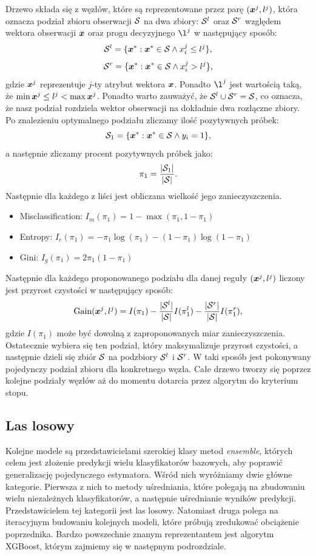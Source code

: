 \documentclass{book}
\begin{document}
	Drzewo składa się z węzłów, które są reprezentowane przez parę $(\boldsymbol{x}^j, l^j)$, która oznacza podział zbioru obserwacji $\mathcal{S}$ na dwa zbiory: $\mathcal{S}^{l}$ oraz $\mathcal{S}^{r}$ względem wektora obserwacji $\boldsymbol{x}$ oraz progu decyzyjnego $\l^j$ w następujący sposób:
	$$ \mathcal{S}^l = \{ \boldsymbol{x}^* : \boldsymbol{x}^* \in \mathcal{S} \land x^j_i \leq l^j \} \text{,} $$
	$$ \mathcal{S}^r = \{ \boldsymbol{x}^* : \boldsymbol{x}^* \in \mathcal{S} \land x^j_i > l^j \} \text{,} $$
	gdzie $\boldsymbol{x}^j$ reprezentuje $j$-ty atrybut wektora $\boldsymbol{x}$. Ponadto $\l^j$ jest wartością taką, że $\min{\boldsymbol{x}^j} \leq l^j < \max{\boldsymbol{x}^j}$. Ponadto warto zauważyć, że $\mathcal{S}^l \cup \mathcal{S}^r = \mathcal{S}$, co oznacza, że nasz podział rozdziela wektor obserwacji na dokładnie dwa rozłączne zbiory.
	Po znalezieniu optymalnego podziału zliczamy ilość pozytywnych próbek:
	$$ \mathcal{S}_1  = \{ \boldsymbol{x}^* : \boldsymbol{x}^* \in \mathcal{S} \land y_i = 1 \} \text{,} $$
	a następnie zliczamy procent pozytywnych próbek jako:
	$$ \pi_1 = \frac{|\mathcal{S}_1|}{|\mathcal{S}|} \text{.}$$
	Następnie dla każdego z liści jest obliczana wielkość jego zanieczyszczenia.
	\begin{itemize}
		\item Misclassification: $I_m(\pi_1) = 1 - \max(\pi_1, 1 - \pi_1)$
		\item Entropy: $I_e(\pi_1) = -\pi_1 \log(\pi_1) - (1 - \pi_1) \log (1 - \pi_1)$
		\item Gini: $I_g(\pi_1) = 2 \pi_1 (1 - \pi_1)$
	\end{itemize}{}
	Następnie dla każdego proponowanego podziału dla danej reguły $(\boldsymbol{x}^j, l^j)$ liczony jest przyrost czystości w następujący sposób:
	$$ \text{Gain}(\boldsymbol{x}^j, l^j) = I(\pi_1) - \frac{|\mathcal{S}^l|}{|\mathcal{S}|} I(\pi_1^l) - \frac{|\mathcal{S}^r|}{|\mathcal{S}|} I(\pi_1^r) \text{,}$$
	gdzie $I(\pi_1)$ może być dowolną z zaproponowanych miar zanieczyszczenia.
	Ostatecznie wybiera się ten podział, który maksymalizuje przyrost czystości, a następnie dzieli się zbiór $\mathcal{S}$ na podzbiory $\mathcal{S}^l$ i $\mathcal{S}^r$.
	W taki sposób jest pokonywany pojedynczy podział zbioru dla konkretnego węzła. Całe drzewo tworzy się poprzez kolejne podziały węzłów aż do momentu dotarcia przez algorytm do kryterium stopu.
	

\subsection{Las losowy}
	Kolejne modele są przedstawicielami szerokiej klasy metod \textit{ensemble}, których celem jest złożenie predykcji wielu klasyfikatorów bazowych, aby poprawić generalizację pojedynczego estymatora. Wśród nich wyróżniamy dwie główne kategorie. Pierwsza z nich to metody uśredniania, które polegają na zbudowaniu wielu niezależnych klasyfikatorów, a następnie uśrednianie wyników predykcji. Przedstawicielem tej kategorii jest las losowy. Natomiast druga polega na iteracyjnym budowaniu kolejnych modeli, które próbują zredukować obciążenie poprzednika. Bardzo powszechnie znanym reprezentantem jest algorytm XGBoost, którym zajmiemy się w następnym podrozdziale.
		
\end{document}
